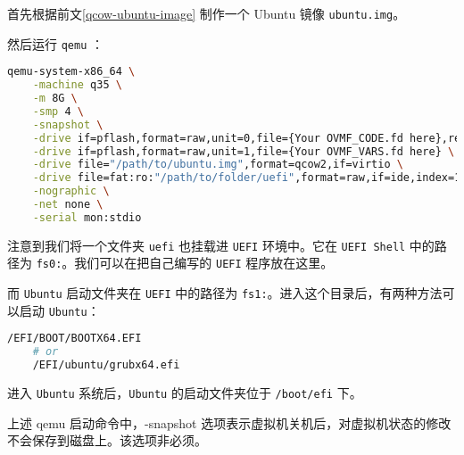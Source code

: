 首先根据前文\ref{qcow-ubuntu-image} 制作一个 Ubuntu 镜像 \texttt{ubuntu.img}。

然后运行 \texttt{qemu} ：

\begin{lstlisting}[language=bash]
    qemu-system-x86_64 \
    -machine q35 \
    -m 8G \
    -smp 4 \
    -snapshot \
    -drive if=pflash,format=raw,unit=0,file={Your OVMF_CODE.fd here},readonly=on \
    -drive if=pflash,format=raw,unit=1,file={Your OVMF_VARS.fd here} \
    -drive file="/path/to/ubuntu.img",format=qcow2,if=virtio \
    -drive file=fat:ro:"/path/to/folder/uefi",format=raw,if=ide,index=1 \
    -nographic \
    -net none \
    -serial mon:stdio
\end{lstlisting}

注意到我们将一个文件夹 \texttt{uefi} 也挂载进 \texttt{UEFI} 环境中。它在 \texttt{UEFI Shell} 中的路径为 \texttt{fs0:}。我们可以在把自己编写的 \texttt{UEFI} 程序放在这里。

而 \texttt{Ubuntu} 启动文件夹在 \texttt{UEFI} 中的路径为 \texttt{fs1:}。进入这个目录后，有两种方法可以启动 \texttt{Ubuntu}：

\begin{lstlisting}[language=bash]
    /EFI/BOOT/BOOTX64.EFI
    # or
    /EFI/ubuntu/grubx64.efi
\end{lstlisting}

进入 \texttt{Ubuntu} 系统后，\texttt{Ubuntu} 的启动文件夹位于 \texttt{/boot/efi} 下。

\begin{remark}
    上述 qemu 启动命令中，-snapshot 选项表示虚拟机关机后，对虚拟机状态的修改不会保存到磁盘上。该选项非必须。
\end{remark}